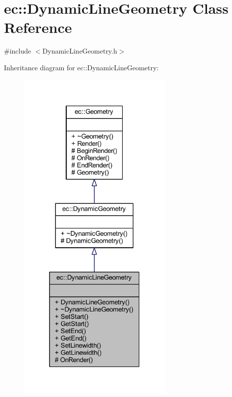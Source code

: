 \hypertarget{classec_1_1_dynamic_line_geometry}{}\section{ec\+:\+:Dynamic\+Line\+Geometry Class Reference}
\label{classec_1_1_dynamic_line_geometry}


{\ttfamily \#include $<$Dynamic\+Line\+Geometry.\+h$>$}



Inheritance diagram for ec\+:\+:Dynamic\+Line\+Geometry\+:
\nopagebreak
\begin{figure}[H]
\begin{center}
\leavevmode
\includegraphics[width=217pt]{classec_1_1_dynamic_line_geometry__inherit__graph}
\end{center}
\end{figure}



